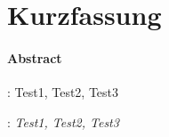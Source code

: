 %
%

\chapter*{Kurzfassung}
\thispagestyle{empty}
\blindtext

\subsubsection*{Abstract}
\textit{\blindtext}
\vspace{8\baselineskip}

{\normalsize
{}:  Test1, Test2, Test3

:  \textit{Test1, Test2, Test3}
}


